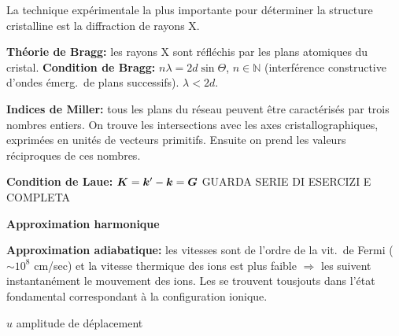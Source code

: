 La technique expérimentale la plus importante pour déterminer la structure cristalline est la diﬀraction de rayons X.
\begin{squishlist}
    \item \textbf{Théorie de Bragg:} les rayons X sont réfléchis par les plans atomiques du cristal. \textbf{Condition de Bragg:} $n \lambda = 2d \sin \Theta$, $n \in \mathbb{N}$ (interférence constructive d'ondes émerg.\ de plans successifs). $\lambda < 2d$.
    \item \textbf{Indices de Miller:} tous les plans du réseau peuvent être caractérisés par trois nombres entiers. On trouve les intersections avec les axes cristallographiques, exprimées en unités de vecteurs primitifs. Ensuite on prend les valeurs réciproques de ces nombres.
    \item \textbf{Condition de Laue:} $\bm{K} = \bm{k}'-\bm{k} = \bm{G}$ GUARDA SERIE DI ESERCIZI E COMPLETA
\end{squishlist}

\begin{squishlist}
    \item \textbf{Approximation harmonique}
    \item \textbf{Approximation adiabatique:} les vitesses \elec sont de l'ordre de la vit.\ de Fermi ($\sim 10^8$ cm/sec) et la vitesse thermique des ions est plus faible $\Rightarrow$ les \elec suivent instantanément le mouvement des ions. Les \elec se trouvent tousjouts dans l'état fondamental correspondant à la configuration ionique.
    \item $u$ amplitude de déplacement
\end{squishlist}

